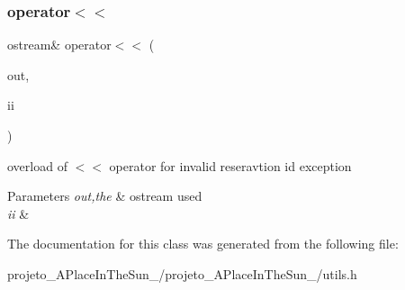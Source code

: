 \subsubsection{\texorpdfstring{operator$<$$<$}{operator<<}}
{\footnotesize\ttfamily ostream\& operator$<$$<$ (\begin{DoxyParamCaption}\item[{ostream \&}]{out,  }\item[{\hyperlink{class_invalid_reservation_i_d}{Invalid\+Reservation\+ID} \&}]{ii }\end{DoxyParamCaption})\hspace{0.3cm}{\ttfamily [friend]}}



overload of $<$$<$ operator for invalid reseravtion id exception 


\begin{DoxyParams}{Parameters}
{\em out,the} & ostream used\\
\hline
{\em ii} & \\
\hline
\end{DoxyParams}


The documentation for this class was generated from the following file\+:\begin{DoxyCompactItemize}
\item 
projeto\+\_\+\+A\+Place\+In\+The\+Sun\+\_/projeto\+\_\+\+A\+Place\+In\+The\+Sun\+\_/utils.\+h\end{DoxyCompactItemize}

